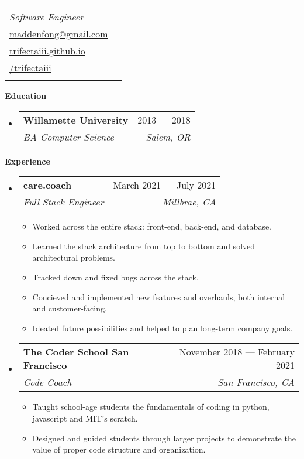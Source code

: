 \documentclass[letterpaper,12pt]{article}[leftmargin=*]
\makeatletter
\def \fullname {Dakota Madden-Fong}
\def \subtitle {Software Engineer}
\def \linkedinicon {\faLinkedin}
\def \linkedinlink {https://www.linkedin.com/in/dakota-madden-fong/}
\def \linkedintext {/dakota-madden-fong}
\def \phoneicon {\faPhone}
\def \phonetext {+1-415-810-0334}
\def \emailicon {\faEnvelope}
\def \emaillink {mailto:maddenfong@gmail.com}
\def \emailtext {maddenfong@gmail.com}
\def \githubicon {\faGithub}
\def \githublink {https://github.com/trifectaiii}
\def \githubtext {/trifectaiii}
\def \websiteicon {\faGlobe}
\def \websitelink {https://trifectaiii.github.io/}
\def \websitetext {trifectaiii.github.io}
\def \headertype {\singlecol} %
\def \entryspacing {-0pt}
\def \linkedin {\linkedinicon \hspace{3pt}\href{\linkedinlink}{\linkedintext}}
\def \phone {\phoneicon \hspace{3pt}{ \phonetext}}
\def \email {\emailicon \hspace{3pt}\href{\emaillink}{\emailtext}}
\def \github {\githubicon \hspace{3pt}\href{\githublink}{\githubtext}}
\def \website {\websiteicon \hspace{3pt}\href{\websitelink}{\websitetext}}
\renewcommand{\section}[2]{\vspace{5pt}
  \colorbox{secondary}{\color{white}\raggedbottom\normalsize\textbf{{#1}{\hspace{7pt}#2}}}
}
\newcommand{\resumeEntryStart}{\begin{itemize}[leftmargin=2.5mm]}
\newcommand{\resumeEntryEnd}{\end{itemize}\vspace{\entryspacing}}
\newcommand{\resumeItemListStart}{\begin{itemize}[leftmargin=4.5mm]}
\newcommand{\resumeItemListEnd}{\end{itemize}}
\newcommand{\resumeItem}[1]{
  \item{%
    {#1 \vspace{-2pt}}
  }
}
\newcommand{\resumeEntryTSDL}[4]{
  \vspace{-1pt}\item[]
    \begin{tabular*}{0.97\textwidth}{l@{\extracolsep{\fill}}r}
      \textbf{\color{primary}#1} & {\firabook\color{accent}\small#2} \\
      \textit{\color{accent}\small#3} & \textit{\color{accent}\small#4} \\
    \end{tabular*}\vspace{-6pt}
}
\newcommand{\doublecol}[6]{
  \begin{tabular*}{\textwidth}{l@{\extracolsep{\fill}}r}
    {
      \begin{tabular}[c]{l}
        \fontsize{35}{45}\selectfont{\color{primary}{{\textbf{\fullname}}}} \\
        {\textit{\subtitle}} %
      \end{tabular}
    } & {
      \begin{tabular}[c]{l@{\hspace{1.5em}}l}
        {\small#4} & {\small#1} \\
        {\small#5} & {\small#2} \\
        {\small#6} & {\small#3}
      \end{tabular}
    }
  \end{tabular*}
}
\newcommand{\singlecol}[4]{%
  \begin{tabular*}{\textwidth}{l@{\extracolsep{\fill}}r}
    {
      \begin{tabular}[b]{l}
        \fontsize{35}{45}\selectfont{\color{primary}{{\textbf{\fullname}}}} \\
        {\textit{\subtitle}} %
      \end{tabular}
    } & {
      \begin{tabular}[c]{l}
        {\small#1} \\
        {\small#2} \\
        {\small#3} \\
        {\small#4} \\
      \end{tabular}
    }
  \end{tabular*}
}
\makeatother
\begin{document}


\headertype{\phone}{\email}{\website}{\github}{}{} %
\vspace{-10pt} %

\section{\faGraduationCap}{Education}

  \resumeEntryStart
    \resumeEntryTSDL
      {Willamette University}{2013 --- 2018}
      {BA Computer Science}{Salem, OR}
  \resumeEntryEnd

\section{\faPieChart}{Experience}

  \resumeEntryStart
    \resumeEntryTSDL
      {care.coach}{March 2021 --- July 2021}
      {Full Stack Engineer}{Millbrae, CA}
    \resumeItemListStart
      \resumeItem {Worked across the entire stack: front-end, back-end, and database.}
      \resumeItem {Learned the stack architecture from top to bottom and solved architectural problems.}
      \resumeItem {Tracked down and fixed bugs across the stack.}
      \resumeItem {Concieved and implemented new features and overhauls, both internal and customer-facing.}
      \resumeItem{Ideated future possibilities and helped to plan long-term company goals.}
    \resumeItemListEnd
  \resumeEntryEnd

  \resumeEntryStart
    \resumeEntryTSDL
      {The Coder School San Francisco}{November 2018 --- February 2021}
      {Code Coach}{San Francisco, CA}
    \resumeItemListStart
      \resumeItem {Taught school-age students the fundamentals of coding in python, javascript and MIT's scratch.}
      \resumeItem {Designed and guided students through larger projects to demonstrate the value of proper code structure and organization.}
    \resumeItemListEnd
  \resumeEntryEnd
\end{document}
